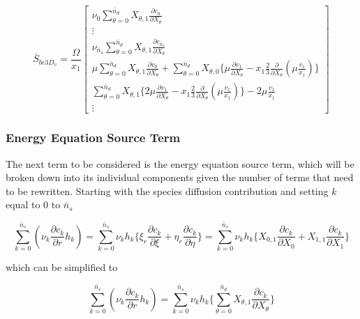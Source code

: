 \begin{displaymath}
	\bar{S}_{be3D_v} = \frac{\Omega}{x_1}\left[ \begin{array}{c}
		\nu_0 \sum_{\theta = 0}^{\bar{n}_d}X_{\theta,1} 
		\frac{\partial c_0}{\partial X_\theta} \\
		\vdots \\
		\nu_{\bar{n}_s} \sum_{\theta = 0}^{\bar{n}_d}X_{\theta,1} 
		\frac{\partial c_{\bar{n}_s}}{\partial X_\theta} \\
		\mu \sum_{\theta = 0}^{\bar{n}_d} X_{\theta,1}\frac{\partial v_0}{\partial X_\theta}
		+ \sum_{\theta = 0}^{\bar{n}_d} X_{\theta,0} \Big\{\mu \frac{\partial v_1}{\partial X_\theta} 
		- x_1 \frac{2}{3} \frac{\partial}{\partial X_\theta}(\mu \frac{v_1}{x_1}) \Big\} \\
		\sum_{\theta = 0}^{\bar{n}_d}X_{\theta,1}\Big\{2\mu\frac{\partial v_1}{\partial X_\theta} 
		-x_1\frac{2}{3}\frac{\partial}{\partial X_\theta}(\mu\frac{v_1}{x_1})\Big\} - 2\mu\frac{v_1}{x_1} \\
		\vdots
		   \end{array}
	    \right]
\end{displaymath}

\subsubsection{Energy Equation Source Term}

	The next term to be considered is the energy equation source term, which will be broken down into its
individual components given the number of terms that need to be rewritten.  Starting with the species diffusion
contribution and setting $k$ equal to  0 to $\bar{n}_s$

\begin{displaymath}
	\sum_{k = 0}^{\bar{n}_s}(\nu_k \frac{\partial c_k}{\partial r}h_k) = 
	\sum_{k = 0}^{\bar{n}_s}\nu_k h_k \Big\{\xi_r \frac{\partial c_k}{\partial \xi} +
	\eta_r \frac{\partial c_k}{\partial \eta}\Big\} =
	\sum_{k = 0}^{\bar{n}_s}\nu_k h_k \Big\{X_{0,1}\frac{\partial c_k}{\partial X_0} +
	X_{1,1} \frac{\partial c_k}{\partial X_1}\Big\}
\end{displaymath}

	which can be simplified to 

\begin{equation}
	\sum_{k = 0}^{\bar{n}_s}(\nu_k \frac{\partial c_k}{\partial r}h_k) = 
	\sum_{k = 0}^{\bar{n}_s}\nu_k h_k \Big\{\sum_{\theta = 0}^{\bar{n}_d} X_{\theta,1}
	\frac{\partial c_k}{\partial X_\theta}\Big\}
\label{eqn:energyA}
\end{equation}
	
